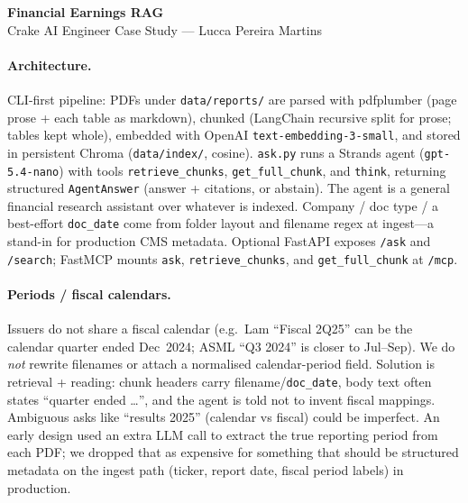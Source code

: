 \documentclass[11pt,a4paper]{article}
\begin{document}
\begin{center}
{\large\bfseries Financial Earnings RAG}\\[2pt]
{\small Crake AI Engineer Case Study --- Lucca Pereira Martins}\\[4pt]
\end{center}

\paragraph{Architecture.}
CLI-first pipeline: PDFs under \texttt{data/reports/} are parsed with pdfplumber (page prose + each table as markdown), chunked (LangChain recursive split for prose; tables kept whole), embedded with OpenAI \texttt{text-embedding-3-small}, and stored in persistent Chroma (\texttt{data/index/}, cosine). \texttt{ask.py} runs a Strands agent (\texttt{gpt-5.4-nano}) with tools \texttt{retrieve\_chunks}, \texttt{get\_full\_chunk}, and \texttt{think}, returning structured \texttt{AgentAnswer} (answer + citations, or abstain). The agent is a general financial research assistant over whatever is indexed. Company / doc type / a best-effort \texttt{doc\_date} come from folder layout and filename regex at ingest---a stand-in for production CMS metadata. Optional FastAPI exposes \texttt{/ask} and \texttt{/search}; FastMCP mounts \texttt{ask}, \texttt{retrieve\_chunks}, and \texttt{get\_full\_chunk} at \texttt{/mcp}.

\paragraph{Periods / fiscal calendars.}
Issuers do not share a fiscal calendar (e.g.\ Lam ``Fiscal 2Q25'' can be the calendar quarter ended Dec~2024; ASML ``Q3 2024'' is closer to Jul--Sep). We do \emph{not} rewrite filenames or attach a normalised calendar-period field. Solution is retrieval + reading: chunk headers carry filename/\texttt{doc\_date}, body text often states ``quarter ended \ldots'', and the agent is told not to invent fiscal mappings. Ambiguous asks like ``results 2025'' (calendar vs fiscal) could be imperfect. An early design used an extra LLM call to extract the true reporting period from each PDF; we dropped that as expensive for something that should be structured metadata on the ingest path (ticker, report date, fiscal period labels) in production.
\end{document}
